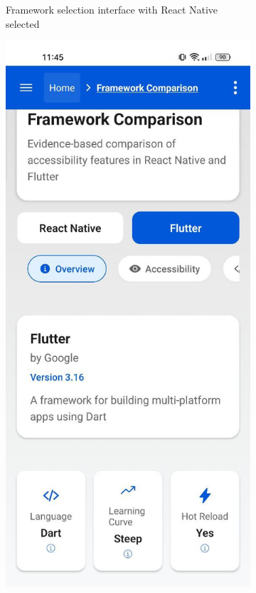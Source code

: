 {\begin{figure}[ht]
\begin{subfigure}[b]{0.48\textwidth}
        \caption{Framework selection interface with React Native selected}
        \label{fig:framework-selection-reactnative}
    \end{subfigure}
    \hfill
    \begin{subfigure}[b]{0.48\textwidth}
        \centering
        \includegraphics[width=\linewidth, alt={Framework selection interface showing Flutter details}]{img/overview2.jpg}

\end{subfigure}
\end{figure}}
